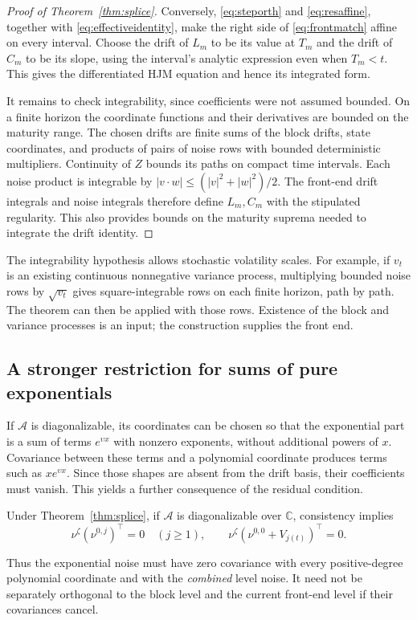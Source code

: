 \begin{proof}[Proof of Theorem~\ref{thm:splice}]
Conversely, \eqref{eq:steporth} and \eqref{eq:resaffine}, together with \eqref{eq:effectiveidentity}, make the right side of \eqref{eq:frontmatch} affine on every interval. Choose the drift of $L_m$ to be its value at $T_m$ and the drift of $C_m$ to be its slope, using the interval's analytic expression even when $T_m<t$. This gives the differentiated HJM equation and hence its integrated form.

It remains to check integrability, since coefficients were not assumed bounded. On a finite horizon the coordinate functions and their derivatives are bounded on the maturity range. The chosen drifts are finite sums of the block drifts, state coordinates, and products of pairs of noise rows with bounded deterministic multipliers. Continuity of $Z$ bounds its paths on compact time intervals. Each noise product is integrable by
$|v\cdot w|\le(|v|^2+|w|^2)/2$. The front-end drift integrals and noise integrals therefore define $L_m,C_m$ with the stipulated regularity. This also provides bounds on the maturity suprema needed to integrate the drift identity. 
\end{proof}

The integrability hypothesis allows stochastic volatility scales. For example, if $v_t$ is an existing continuous nonnegative variance process, multiplying bounded noise rows by $\sqrt{v_t}$ gives square-integrable rows on each finite horizon, path by path. The theorem can then be applied with those rows. Existence of the block and variance processes is an input; the construction supplies the front end.

\subsection{A stronger restriction for sums of pure exponentials}
If $\mathcal A$ is diagonalizable, its coordinates can be chosen so that the exponential part is a sum of terms $e^{\upsilon x}$ with nonzero exponents, without additional powers of $x$. Covariance between these terms and a polynomial coordinate produces terms such as $x e^{\upsilon x}$. Since those shapes are absent from the drift basis, their coefficients must vanish. This yields a further consequence of the residual condition.

\begin{corollary}\label{cor:diagonal}
Under Theorem~\ref{thm:splice}, if $\mathcal A$ is diagonalizable over $\mathbb C$, consistency implies
\begin{equation}
\nu^\zeta(\nu^{0,j})^\top=0\quad(j\ge1),\qquad
\nu^\zeta(\nu^{0,0}+V_{j(t)})^\top=0.\label{eq:effectiveorth}
\end{equation}
\end{corollary}
Thus the exponential noise must have zero covariance with every positive-degree polynomial coordinate and with the \emph{combined} level noise. It need not be separately orthogonal to the block level and the current front-end level if their covariances cancel.

